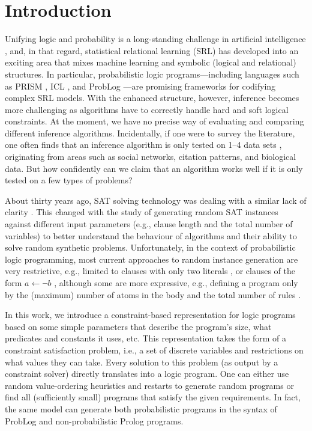 \documentclass[runningheads]{llncs}
\begin{document}
\section{Introduction}

Unifying logic and probability is a long-standing challenge in artificial
intelligence \cite{DBLP:journals/cacm/Russell15}, and, in that regard,
statistical relational learning (SRL) has developed into an exciting area that
mixes machine learning and symbolic (logical and relational) structures. In
particular, probabilistic logic programs---including languages such as PRISM
\cite{DBLP:conf/ijcai/SatoK97}, ICL \cite{DBLP:journals/ai/Poole97}, and ProbLog
\cite{DBLP:conf/ijcai/RaedtKT07}---are promising frameworks for codifying
complex SRL models. With the enhanced structure, however, inference becomes more
challenging as algorithms have to correctly handle hard and soft logical
constraints. At the moment, we have no precise way of evaluating and comparing
different inference algorithms. Incidentally, if one were to survey the
literature, one often finds that an inference algorithm is only tested on 1--4
data sets
\cite{DBLP:conf/ecai/BruynoogheMKGVJR10,DBLP:journals/tplp/KimmigDRCR11,DBLP:conf/ijcai/VlasselaerBKMR15},
originating from areas such as social networks, citation patterns, and
biological data. But how confidently can we claim that an algorithm works well
if it is only tested on a few types of problems?

About thirty years ago, SAT solving technology was dealing with a similar lack
of clarity \cite{DBLP:journals/ai/SelmanML96}. This changed with the study of
generating random SAT instances against different input parameters (e.g.,
clause length and the total number of variables) to better understand the
behaviour of algorithms and their ability to solve random synthetic problems.
Unfortunately, in the context of probabilistic logic programming, most current
approaches to random instance generation are very restrictive, e.g., limited to
clauses with only two literals \cite{DBLP:conf/lpnmr/NamasivayamT09}, or clauses
of the form $a \gets \neg b$ \cite{DBLP:journals/tocl/WenWSL16}, although some
are more expressive, e.g., defining a program only by the (maximum) number of
atoms in the body and the total number of rules \cite{DBLP:conf/iclp/ZhaoL03}.

In this work, we introduce a constraint-based representation for logic programs
based on some simple parameters that describe the program's size, what
predicates and constants it uses, etc. This representation takes the form of a
constraint satisfaction problem, i.e., a set of discrete variables and
restrictions on what values they can take. Every solution to this problem (as
output by a constraint solver) directly translates into a logic program. One can
either use random value-ordering heuristics and restarts to generate random
programs or find all (sufficiently small) programs that satisfy the given
requirements. In fact, the same model can generate both probabilistic programs
in the syntax of ProbLog \cite{DBLP:conf/ijcai/RaedtKT07} and non-probabilistic
Prolog programs.
\end{document}

